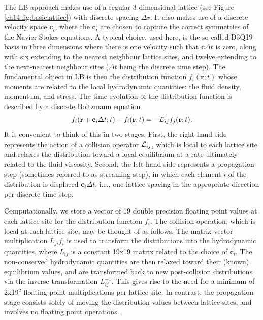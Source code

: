 The LB approach makes use of a regular 3-dimensional
lattice (see Figure \ref{ch14:fig:basiclattice}) with discrete spacing $\Delta r$. It also makes use of a
discrete velocity space $\mathbf{c}_i$, where the $\mathbf{c}_i$
are chosen to capture the correct symmetries of the Navier-Stokes
equations. A typical choice, used here, is the so-called D3Q19
basis in three dimensions where there is one velocity such that
$\mathbf{c} \Delta t$ is zero, along with six extending to the nearest
neighbour
lattice sites, and twelve extending to the next-nearest neighbour sites
($\Delta t$ being the discrete time step). The fundamental object
in LB is then the distribution function $f_i (\mathbf{r};t)$ whose
moments are related to the local hydrodynamic quantities: the fluid
density, momentum, and stress. The time evolution of the distribution
function is described by a discrete Boltzmann equation
\begin{equation}
f_i(\mathbf{r} + \mathbf{c}_i \Delta t; t) - f_i(\mathbf{r}; t) 
= - {\cal L}_{ij} f_j(\mathbf{r};t).
\end{equation}
It is convenient to think of this in two stages. First, the right hand
side represents the action of a collision operator ${\cal L}_{ij}$,
which is local to each lattice site and relaxes the distribution toward
a local equilibrium at a rate ultimately related to the fluid viscosity.
Second, the left hand side represents a propagation step (sometimes referred
to as streaming step), in which each element $i$ of the distribution is
displaced $\mathbf{c}_i \Delta t$, i.e., one lattice spacing in the
appropriate direction per discrete time step. 

Computationally, we store a vector of 19 double precision floating
point values at each lattice site for the distribution function $f_i$.
The collision operation, which is local at each lattice site, may be
thought of as follows. The matrix-vector multiplication $L_{ji}f_i$ is
used to transform the distributions into the hydrodynamic quantities,
where $L_{ij}$ is a constant 19x19 matrix related to the choice of
$\mathbf{c}_i$. The non-conserved hydrodynamic quantities are then
relaxed toward their (known) equilibrium values, and are transformed
back to new post-collision distributions via the inverse transformation
$L^{-1}_{ij}$. This gives rise to the need for a minimum of 2x19$^2$
floating point multiplications per lattice site. In contrast, the
propagation stage consists solely of moving the distribution values
between lattice sites, and involves no floating point operations.

